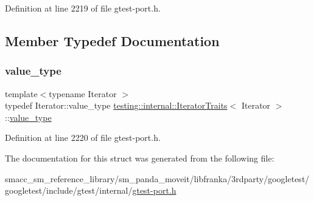 Definition at line 2219 of file gtest-\/port.\+h.



\subsection{Member Typedef Documentation}
\mbox{\label{structtesting_1_1internal_1_1IteratorTraits_a29de4320a9c53ce438d3561b94e515bb}} 
\subsubsection{\texorpdfstring{value\+\_\+type}{value\_type}}
{\footnotesize\ttfamily template$<$typename Iterator $>$ \\
typedef Iterator\+::value\+\_\+type \hyperlink{structtesting_1_1internal_1_1IteratorTraits}{testing\+::internal\+::\+Iterator\+Traits}$<$ Iterator $>$\+::\hyperlink{structtesting_1_1internal_1_1IteratorTraits_a29de4320a9c53ce438d3561b94e515bb}{value\+\_\+type}}



Definition at line 2220 of file gtest-\/port.\+h.



The documentation for this struct was generated from the following file\+:\begin{DoxyCompactItemize}
\item 
smacc\+\_\+sm\+\_\+reference\+\_\+library/sm\+\_\+panda\+\_\+moveit/libfranka/3rdparty/googletest/googletest/include/gtest/internal/\hyperlink{gtest-port_8h}{gtest-\/port.\+h}\end{DoxyCompactItemize}

